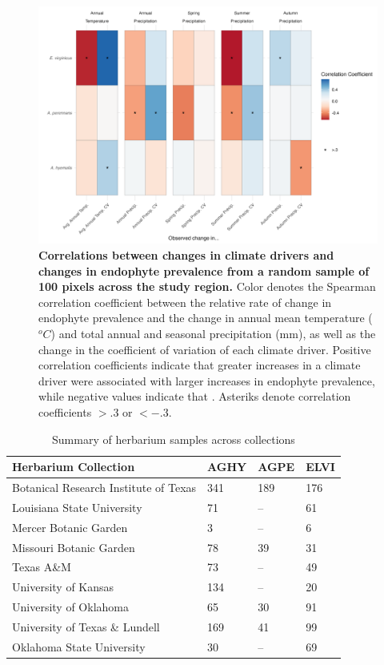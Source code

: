\documentclass[11pt]{article}
\begin{document}
\begin{figure}[H]
	\centering
	\includegraphics[width = \linewidth]{climate_corr_heatmap_subsample.png}
	\caption{\textbf{Correlations between changes in climate drivers and changes in endophyte prevalence from a random sample of 100 pixels across the study region.} Color denotes the Spearman correlation coefficient between the relative rate of change in endophyte prevalence and the change in annual mean temperature ($^oC$) and total annual and seasonal precipitation (mm), as well as the change in the coefficient of variation of each climate driver. Positive correlation coefficients indicate that greater increases in a climate driver were associated with larger increases in endophyte prevalence, while negative values indicate that . Asteriks denote correlation coefficients $> .3$ or $< -.3$.}
	\label{fig:FigA5}
\end{figure}


	
	\begin{table}[h]
		\caption{Summary of herbarium samples across collections}
		\label{Table:herbaria}
		\centering
		\begin{tabular}{llll}\hline
			Herbarium Collection        & AGHY        & AGPE      &      ELVI\\ \hline
			Botanical Research Institute of Texas &   341   &    189&    176    \\
			Louisiana State University &     71  & --  &   61       \\
			Mercer Botanic Garden &   3    & --     &     6\\
			Missouri Botanic Garden& 78 & 39& 31\\
		    Texas A\&M &  73&-- & 49 \\
		    University of Kansas & 134 & -- &  20\\
		    University of Oklahoma & 65 &30&  91\\
		    University of Texas  \& Lundell   &  169& 41& 99\\		    				 			     			     
			Oklahoma State University&     30  &   --    &  69 \\ \hline
		\end{tabular}
		\bigskip{}

	\end{table}
	
\end{document}
